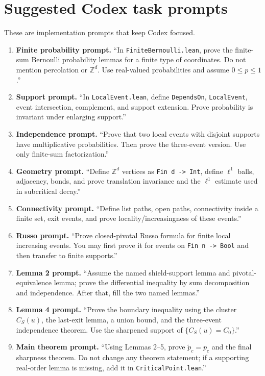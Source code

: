 \documentclass[11pt]{article}
\newcommand{\Z}{\mathbb Z}
\newcommand{\pcrit}{p_c}
\newcommand{\ptilde}{\widetilde p_c}
\theoremstyle{definition}
\theoremstyle{plain}
\begin{document}
\section{Suggested Codex task prompts}

These are implementation prompts that keep Codex focused.

\begin{enumerate}[leftmargin=1.4em]
  \item \textbf{Finite probability prompt.} ``In \texttt{FiniteBernoulli.lean}, prove the finite-sum Bernoulli probability lemmas for a finite type of coordinates.  Do not mention percolation or $\Z^d$.  Use real-valued probabilities and assume $0\le p\le1$.''
  \item \textbf{Support prompt.} ``In \texttt{LocalEvent.lean}, define \texttt{DependsOn}, \texttt{LocalEvent}, event intersection, complement, and support extension.  Prove probability is invariant under enlarging support.''
  \item \textbf{Independence prompt.} ``Prove that two local events with disjoint supports have multiplicative probabilities.  Then prove the three-event version.  Use only finite-sum factorization.''
  \item \textbf{Geometry prompt.} ``Define $\Z^d$ vertices as \texttt{Fin d -> Int}, define $\ell^1$ balls, adjacency, bonds, and prove translation invariance and the $\ell^1$ estimate used in subcritical decay.''
  \item \textbf{Connectivity prompt.} ``Define list paths, open paths, connectivity inside a finite set, exit events, and prove locality/increasingness of these events.''
  \item \textbf{Russo prompt.} ``Prove closed-pivotal Russo formula for finite local increasing events.  You may first prove it for events on \texttt{Fin n -> Bool} and then transfer to finite supports.''
  \item \textbf{Lemma 2 prompt.} ``Assume the named shield-support lemma and pivotal-equivalence lemma; prove the differential inequality by sum decomposition and independence.  After that, fill the two named lemmas.''
  \item \textbf{Lemma 4 prompt.} ``Prove the boundary inequality using the cluster $C_S(u)$, the last-exit lemma, a union bound, and the three-event independence theorem.  Use the sharpened support of $\{C_S(u)=C_0\}$.''
  \item \textbf{Main theorem prompt.} ``Using Lemmas 2--5, prove $\ptilde=\pcrit$ and the final sharpness theorem.  Do not change any theorem statement; if a supporting real-order lemma is missing, add it in \texttt{CriticalPoint.lean}.''
\end{enumerate}
\end{document}

